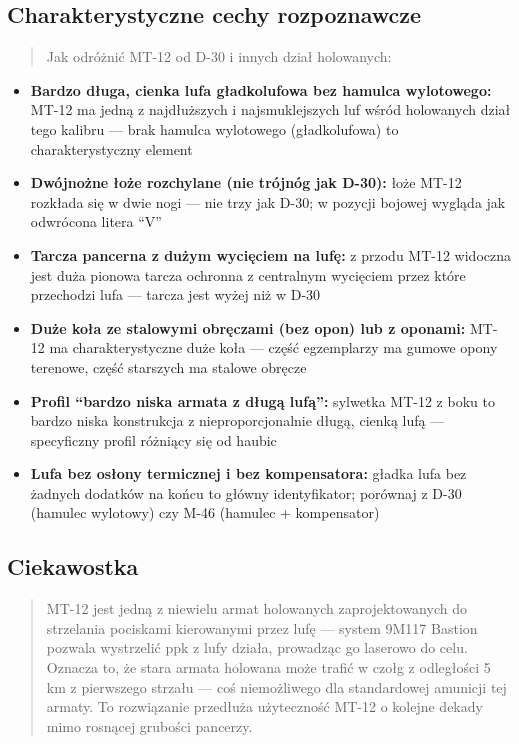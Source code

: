 \documentclass[12pt,oneside]{book}
\providecommand{\tightlist}{%
  \setlength{\itemsep}{0pt}\setlength{\parskip}{0pt}}
\begin{document}
\subsection{Charakterystyczne cechy
rozpoznawcze}\label{charakterystyczne-cechy-rozpoznawcze-33}

\begin{quote}
Jak odróżnić MT-12 od D-30 i innych dział holowanych:
\end{quote}

\begin{itemize}
\tightlist
\item
  \textbf{Bardzo długa, cienka lufa gładkolufowa bez hamulca
  wylotowego:} MT-12 ma jedną z najdłuższych i najsmuklejszych luf wśród
  holowanych dział tego kalibru --- brak hamulca wylotowego
  (gładkolufowa) to charakterystyczny element
\item
  \textbf{Dwójnożne łoże rozchylane (nie trójnóg jak D-30):} łoże MT-12
  rozkłada się w dwie nogi --- nie trzy jak D-30; w pozycji bojowej
  wygląda jak odwrócona litera ``V''
\item
  \textbf{Tarcza pancerna z dużym wycięciem na lufę:} z przodu MT-12
  widoczna jest duża pionowa tarcza ochronna z centralnym wycięciem
  przez które przechodzi lufa --- tarcza jest wyżej niż w D-30
\item
  \textbf{Duże koła ze stalowymi obręczami (bez opon) lub z oponami:}
  MT-12 ma charakterystyczne duże koła --- część egzemplarzy ma gumowe
  opony terenowe, część starszych ma stalowe obręcze
\item
  \textbf{Profil ``bardzo niska armata z długą lufą'':} sylwetka MT-12 z
  boku to bardzo niska konstrukcja z nieproporcjonalnie długą, cienką
  lufą --- specyficzny profil różniący się od haubic
\item
  \textbf{Lufa bez osłony termicznej i bez kompensatora:} gładka lufa
  bez żadnych dodatków na końcu to główny identyfikator; porównaj z D-30
  (hamulec wylotowy) czy M-46 (hamulec + kompensator)
\end{itemize}

\subsection{Ciekawostka}\label{ciekawostka-33}

\begin{quote}
MT-12 jest jedną z niewielu armat holowanych zaprojektowanych do
strzelania pociskami kierowanymi przez lufę --- system 9M117 Bastion
pozwala wystrzelić ppk z lufy działa, prowadząc go laserowo do celu.
Oznacza to, że stara armata holowana może trafić w czołg z odległości 5
km z pierwszego strzału --- coś niemożliwego dla standardowej amunicji
tej armaty. To rozwiązanie przedłuża użyteczność MT-12 o kolejne dekady
mimo rosnącej grubości pancerzy.
\end{quote}
\end{document}
